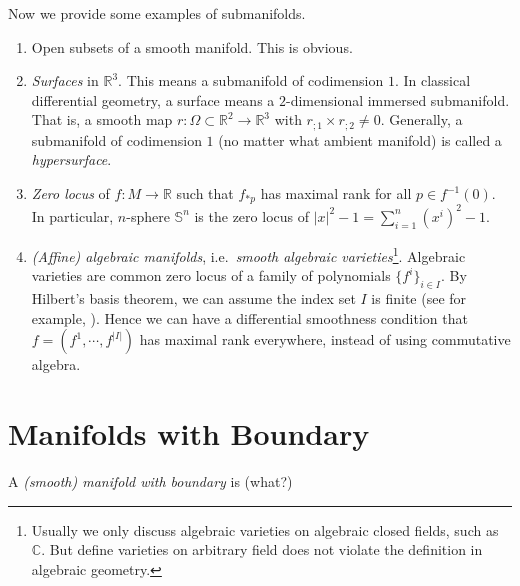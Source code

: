 Now we provide some examples of submanifolds.
\begin{eg}
    \begin{enumerate}[(1)]
        \item Open subsets of a smooth manifold.
        This is obvious.
        \item \emph{Surfaces} in $\mathbb{R}^3$.
        This means a submanifold of codimension $1$.
        In classical differential geometry, a surface means a $2$-dimensional immersed submanifold.
        That is, a smooth map $r:\Omega\subset\mathbb{R}^2\to\mathbb{R}^3$ with $r_{;1}\times r_{;2}\neq 0$.
        Generally, a submanifold of codimension $1$ (no matter what ambient manifold) is called a \emph{hypersurface}.
        \item \emph{Zero locus} of $f:M\to\mathbb{R}$ such that $f_{*p}$ has maximal rank for all $p\in f^{-1}(0)$.
        In particular, $n$-sphere $\mathbb{S}^n$ is the zero locus of $|x|^2-1=\sum_{i=1}^n(x^i)^2-1$.
        \item \emph{(Affine) algebraic manifolds}, i.e.\ \emph{smooth algebraic varieties}\footnote{Usually we only discuss algebraic varieties on algebraic closed fields, such as $\mathbb{C}$. But define varieties on arbitrary field does not violate the definition in algebraic geometry.}.
        Algebraic varieties are common zero locus of a family of polynomials $\{f^i\}_{i\in I}$.
        By Hilbert's basis theorem, we can assume the index set $I$ is finite (see for example, \cite[Theorem~B-1.16]{Rotman}).
        Hence we can have a differential smoothness condition that $f=(f^1,\cdots,f^{|I|})$ has maximal rank everywhere, instead of using commutative algebra.
    \end{enumerate}
\end{eg}

\section{Manifolds with Boundary}

\begin{defn}
    A \emph{(smooth) manifold with boundary} is (what?)
\end{defn}